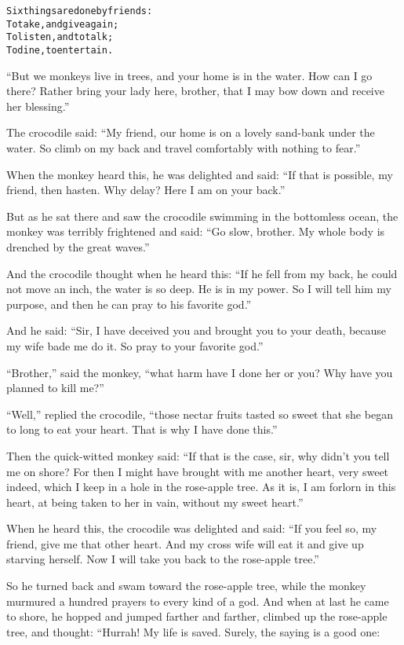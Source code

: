 \documentclass{article}
\renewenvironment{verbatim}{\begin{alltt}\normalfont\begin{centering}}{\end{centering}\end{alltt}}
\begin{document}
\begin{verbatim}
Six things are done by friends:
To take, and give again;
To listen, and to talk;
To dine, to entertain.
\end{verbatim}
``But we monkeys live in trees, and your home is in the water. How can I go there? Rather bring your lady here, brother, that I may bow down and receive her blessing.''

The crocodile said:
``My friend, our home is on a lovely sand-bank under the water. So climb on my back and travel comfortably with nothing to fear.''

When the monkey heard this, he was delighted and said:
``If that is possible, my friend, then hasten. Why delay? Here I am on your back.''

But as he sat there and saw the crocodile swimming in the
bottomless ocean, the monkey was terribly frightened and said:
``Go slow, brother. My whole body is drenched by the great waves.''

And the crocodile thought when he heard this:
``If he fell from my back, he could not move an inch, the water is so deep. He is in my power. So I will tell him my purpose, and then he can pray to his favorite god.''

And he said:
``Sir, I have deceived you and brought you to your death, because my wife bade me do it. So pray to your favorite god.''

``Brother,'' said the monkey,
``what harm have I done her or you? Why have you planned to kill me?''

``Well,'' replied the crocodile,
``those nectar fruits tasted so sweet that she began to long to eat your heart. That is why I have done this.''

Then the quick-witted monkey said:
``If that is the case, sir, why didn't you tell me on shore? For then I might have brought with me another heart, very sweet indeed, which I keep in a hole in the rose-apple tree. As it is, I am forlorn in this heart, at being taken to her in vain, without my sweet heart.''

When he heard this, the crocodile was delighted and said:
``If you feel so, my friend, give me that other heart. And my cross wife will eat it and give up starving herself. Now I will take you back to the rose-apple tree.''

So he turned back and swam toward the rose-apple tree, while the
monkey murmured a hundred prayers to every kind of a god. And when
at last he came to shore, he hopped and jumped farther and farther,
climbed up the rose-apple tree, and thought: “Hurrah! My life is
saved. Surely, the saying is a good one:
\end{document}
